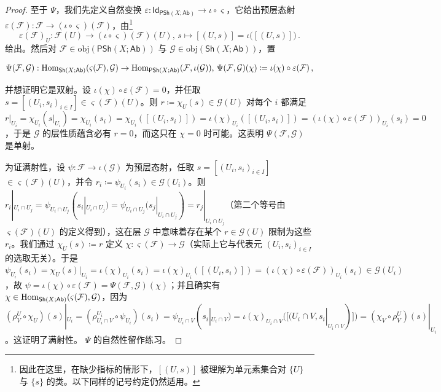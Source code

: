 \begin{proof}
至于 $\Psi$，我们先定义自然变换 $\varepsilon:\mathsf{Id}_{\mathsf{PSh}(X;\mathsf{Ab})}\rightarrow\iota\circ\varsigma$，它给出预层态射 $\varepsilon(\mathcal{F}):\mathcal{F}\rightarrow(\iota\circ\varsigma)(\mathcal{F})$，由\footnote{因此在这里，在缺少指标的情形下，$[(U,s)]$ 被理解为单元素集合对 $\{U\}$ 与 $\{s\}$ 的类。以下同样的记号约定仍然适用。}
\[
\varepsilon(\mathcal{F})_U:\mathcal{F}(U)\rightarrow(\iota\circ\varsigma)(\mathcal{F})(U),\, s\mapsto[(U,s)]=\iota\big([(U,s)]\big)\,.
\]
给出。然后对 $\mathcal{F}\in\text{obj}(\mathsf{PSh}(X;\mathsf{Ab}))$ 与 $\mathcal{G}\in\text{obj}(\mathsf{Sh}(X;\mathsf{Ab}))$，置
\begin{small}
	\[
	\Psi(\mathcal{F},\mathcal{G}):\textup{Hom}_{\mathsf{Sh}(X;\mathsf{Ab})}(\varsigma(\mathcal{F}),\mathcal{G})\rightarrow\textup{Hom}_{\mathsf{PSh}(X;\mathsf{Ab})}(\mathcal{F},\iota(\mathcal{G})),\,\Psi(\mathcal{F},\mathcal{G})(\chi)\coloneqq\iota(\chi)\circ\varepsilon(\mathcal{F})\,,
	\]
\end{small}
并想证明它是双射。设 $\iota(\chi)\circ\varepsilon(\mathcal{F})=0$，并任取 $s=[(U_i,s_i)_{i\in I}]\in\varsigma(\mathcal{F})(U)$。则 $r\coloneqq\chi_U(s)\in\mathcal{G}(U)$ 对每个 $i$ 都满足 $r|_{U_i}=\chi_{U_i}(s|_{U_i})=\chi_{U_i}(s_i)=\chi_{U_i}([(U_i,s_i)])=\iota(\chi)_{U_i}([(U_i,s_i)])=(\iota(\chi)\circ\varepsilon(\mathcal{F}))_{U_i}(s_i)=0$，于是 $\mathcal{G}$ 的层性质蕴含必有 $r=0$，而这只在 $\chi=0$ 时可能。这表明 $\Psi(\mathcal{F},\mathcal{G})$ 是单射。

为证满射性，设 $\psi:\mathcal{F}\rightarrow\iota(\mathcal{G})$ 为预层态射，任取 $s=[(U_i,s_i)_{i\in I}]$ $\in\varsigma(\mathcal{F})(U)$，并令 $r_i\coloneqq \psi_{U_i}(s_i)\in\mathcal{G}(U_i)$。则 $r_i|_{U_i\cap U_j}=\psi_{U_i\cap U_j}(s_i|_{U_i\cap U_j})=\psi_{U_i\cap U_j}(s_j|_{U_i\cap U_j})=r_j|_{U_i\cap U_j}$（第二个等号由 $\varsigma(\mathcal{F})(U)$ 的定义得到），这在层 $\mathcal{G}$ 中意味着存在某个 $r\in\mathcal{G}(U)$ 限制为这些 $r_i$。我们通过 $\chi_U(s)\coloneqq r$ 定义 $\chi:\varsigma(\mathcal{F})\rightarrow\mathcal{G}$（实际上它与代表元 $(U_i,s_i)_{i\in I}$ 的选取无关）。于是 $\psi_{U_i}(s_i)=\chi_U(s)|_{U_i}=\iota(\chi)_{U_i}(s_i)=\iota(\chi)_{U_i}([(U_i,s_i)])=(\iota(\chi)\circ\varepsilon(\mathcal{F}))_{U_i}(s_i)\in\mathcal{G}(U_i)$，故 $\psi=\iota(\chi)\circ\varepsilon(\mathcal{F})=\Psi(\mathcal{F},\mathcal{G})(\chi)$；并且确实有 $\chi\in\textup{Hom}_{\mathsf{Sh}(X;\mathsf{Ab})}(\varsigma(\mathcal{F}),\mathcal{G})$，因为 $(\rho^U_V\circ\chi_U)(s)|_{U_i}=(\rho^{U_i}_{U_i\cap V}\circ\psi_{U_i})(s_i)=\psi_{U_i\cap V}(s_i|_{U_i\cap V})=\iota(\chi)_{U_i\cap V}([(U_i\cap V,s_i|_{U_i\cap V})])=(\chi_V\circ\rho^U_V)(s)|_{U_i}$。这证明了满射性。
$\Psi$ 的自然性留作练习。
\end{proof}

